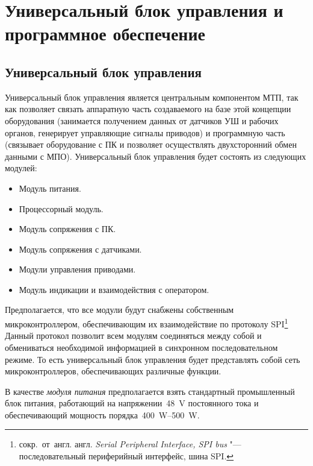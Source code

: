 \section{Универсальный блок управления и программное обеспечение}

\subsection{Универсальный блок управления}

Универсальный блок управления является центральным компонентом \foreignlanguage{english}{МТП}, так как позволяет связать аппаратную часть создаваемого на базе этой концепции оборудования (занимается получением данных от датчиков УШ и рабочих органов, генерирует управляющие сигналы приводов) и программную часть (связывает оборудование с ПК и позволяет осуществлять двухсторонний обмен данными с \foreignlanguage{english}{МПО}). Универсальный блок управления будет состоять из следующих модулей:

\begin{itemize}
	\item Модуль питания.
	
	\item Процессорный модуль.
	
	\item Модуль сопряжения с ПК.
	
	\item Модуль сопряжения с датчиками.
	
	\item Модули управления приводами.
	
	\item Модуль индикации и взаимодействия с оператором.
\end{itemize}

Предполагается, что все модули будут снабжены собственным микроконтроллером, обеспечивающим их взаимодействие по протоколу \foreignlanguage{english}{SPI}\footnote{сокр.~от~англ. англ. \textit{Serial Peripheral Interface, SPI bus} "--- последовательный периферийный интерфейс, шина SPI.} Данный протокол позволит всем модулям соединяться между собой и обмениваться необходимой информацией в синхронном последовательном режиме. То есть универсальный блок управления будет представлять собой сеть микроконтроллеров, обеспечивающих различные функции.

В качестве \textit{модуля питания} предполагается взять стандартный промышленный блок питания, работающий на напряжении~\SI{48}{\volt} постоянного тока и обеспечивающий мощность порядка~\SIrange{400}{500}{\watt}.

